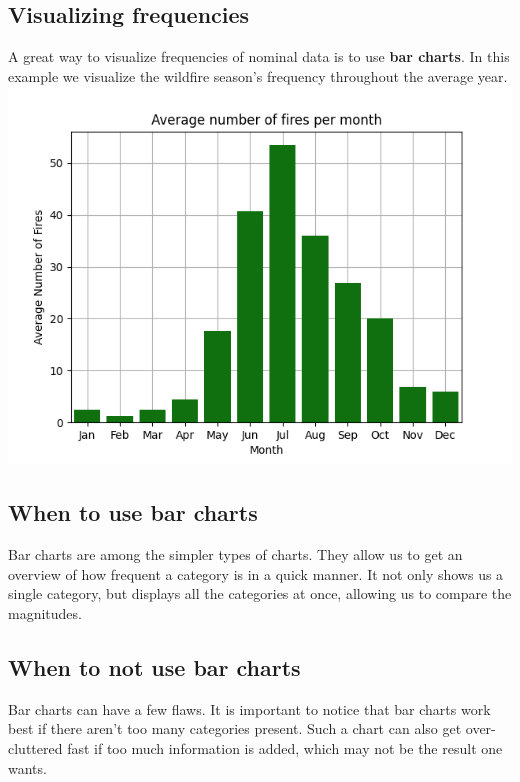 \begin{multicols}{2}
\section*{Visualizing frequencies}
A great way to visualize frequencies of nominal data is to use \textbf{bar charts}. In this example we visualize the wildfire season's frequency throughout the average year.
\includegraphics[width=\columnwidth]{Images/figures/fires_per_month_barchart.png}
\label{fig:Bar chart}
\subsection*{When to use bar charts}
Bar charts are among the simpler types of charts. They allow us to get an overview of how frequent a category is in a quick manner. It not only shows us a single category, but displays all the categories at once, allowing us to compare the magnitudes.
\subsection*{When to not use bar charts}
Bar charts can have a few flaws. It is important to notice that bar charts work best if there aren't too many categories present. Such a chart can also get over-cluttered fast if too much information is added, which may not be the result one wants.


\end{multicols}
